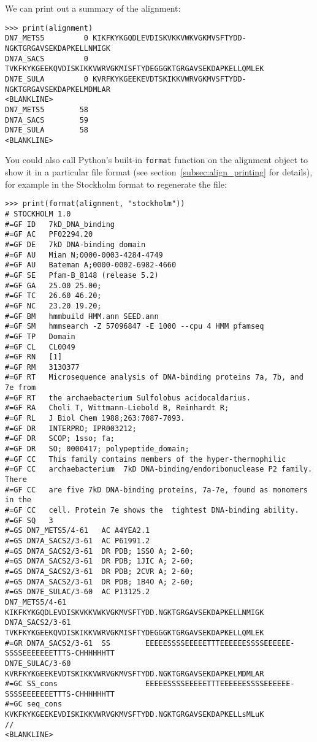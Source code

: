 \noindent We can print out a summary of the alignment:

\begin{verbatim}
>>> print(alignment)
DN7_METS5         0 KIKFKYKGQDLEVDISKVKKVWKVGKMVSFTYDD-NGKTGRGAVSEKDAPKELLNMIGK
DN7A_SACS         0 TVKFKYKGEEKQVDISKIKKVWRVGKMISFTYDEGGGKTGRGAVSEKDAPKELLQMLEK
DN7E_SULA         0 KVRFKYKGEEKEVDTSKIKKVWRVGKMVSFTYDD-NGKTGRGAVSEKDAPKELMDMLAR
<BLANKLINE>
DN7_METS5        58
DN7A_SACS        59
DN7E_SULA        58
<BLANKLINE>
\end{verbatim}

You could also call Python's built-in \verb|format| function on the alignment object to show it in a particular file format (see section~\ref{subsec:align_printing} for details), for example in the Stockholm format to regenerate the file:
\begin{verbatim}
>>> print(format(alignment, "stockholm"))
# STOCKHOLM 1.0
#=GF ID   7kD_DNA_binding
#=GF AC   PF02294.20
#=GF DE   7kD DNA-binding domain
#=GF AU   Mian N;0000-0003-4284-4749
#=GF AU   Bateman A;0000-0002-6982-4660
#=GF SE   Pfam-B_8148 (release 5.2)
#=GF GA   25.00 25.00;
#=GF TC   26.60 46.20;
#=GF NC   23.20 19.20;
#=GF BM   hmmbuild HMM.ann SEED.ann
#=GF SM   hmmsearch -Z 57096847 -E 1000 --cpu 4 HMM pfamseq
#=GF TP   Domain
#=GF CL   CL0049
#=GF RN   [1]
#=GF RM   3130377
#=GF RT   Microsequence analysis of DNA-binding proteins 7a, 7b, and 7e from
#=GF RT   the archaebacterium Sulfolobus acidocaldarius.
#=GF RA   Choli T, Wittmann-Liebold B, Reinhardt R;
#=GF RL   J Biol Chem 1988;263:7087-7093.
#=GF DR   INTERPRO; IPR003212;
#=GF DR   SCOP; 1sso; fa;
#=GF DR   SO; 0000417; polypeptide_domain;
#=GF CC   This family contains members of the hyper-thermophilic
#=GF CC   archaebacterium  7kD DNA-binding/endoribonuclease P2 family. There
#=GF CC   are five 7kD DNA-binding proteins, 7a-7e, found as monomers in the
#=GF CC   cell. Protein 7e shows the  tightest DNA-binding ability.
#=GF SQ   3
#=GS DN7_METS5/4-61   AC A4YEA2.1
#=GS DN7A_SACS2/3-61  AC P61991.2
#=GS DN7A_SACS2/3-61  DR PDB; 1SSO A; 2-60;
#=GS DN7A_SACS2/3-61  DR PDB; 1JIC A; 2-60;
#=GS DN7A_SACS2/3-61  DR PDB; 2CVR A; 2-60;
#=GS DN7A_SACS2/3-61  DR PDB; 1B4O A; 2-60;
#=GS DN7E_SULAC/3-60  AC P13125.2
DN7_METS5/4-61                  KIKFKYKGQDLEVDISKVKKVWKVGKMVSFTYDD.NGKTGRGAVSEKDAPKELLNMIGK
DN7A_SACS2/3-61                 TVKFKYKGEEKQVDISKIKKVWRVGKMISFTYDEGGGKTGRGAVSEKDAPKELLQMLEK
#=GR DN7A_SACS2/3-61  SS        EEEEESSSSEEEEETTTEEEEEESSSSEEEEEE-SSSSEEEEEEETTTS-CHHHHHHTT
DN7E_SULAC/3-60                 KVRFKYKGEEKEVDTSKIKKVWRVGKMVSFTYDD.NGKTGRGAVSEKDAPKELMDMLAR
#=GC SS_cons                    EEEEESSSSEEEEETTTEEEEEESSSSEEEEEE-SSSSEEEEEEETTTS-CHHHHHHTT
#=GC seq_cons                   KVKFKYKGEEKEVDISKIKKVWRVGKMVSFTYDD.NGKTGRGAVSEKDAPKELLsMLuK
//
<BLANKLINE>
\end{verbatim}
